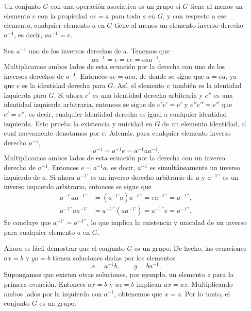 \begin{theorem}{}{}
    Un conjunto $G$ con una operación asociativa es un grupo si $G$ tiene al menos un elemento $e$ con la propiedad $ae = a$ para todo $a$ en $G$, y con respecto a ese elemento, cualquier elemento $a$ en $G$ tiene al menos un elemento inverso derecho $a^{-1}$, es decir, $aa^{-1} = e$.

    \tcblower
    \demostracion Sea $a^{-1}$ uno de los inversos derechos de $a$. Tenemos que
    $$aa^{-1} = e = ee = eaa^{-1}.$$
    Multiplicamos ambos lados de esta ecuación por la derecha con uno de los inversos derechos de $a^{-1}$. Entonces $ae = aea$, de donde se sigue que $a = ea$, ya que $e$ es la identidad derecha para $G$. Así, el elemento $e$ también es la identidad izquierda para $G$. Si ahora $e'$ es una identidad derecha arbitraria y $e''$ es una identidad izquierda arbitraria, entonces se sigue de $e'e' = e'$ y $e''e'' = e''$ que $e' = e''$, es decir, cualquier identidad derecha es igual a cualquier identidad izquierda. Esto prueba la existencia y unicidad en $G$ de un elemento identidad, al cual nuevamente denotamos por $e$. Además, para cualquier elemento inverso derecho $a^{-1}$,
    $$a^{-1} = a^{-1}e = a^{-1}aa^{-1}.$$
    Multiplicamos ambos lados de esta ecuación por la derecha con un inverso derecho de $a^{-1}$. Entonces $e = a^{-1}a$, es decir, $a^{-1}$ es simultáneamente un inverso izquierdo de $a$. Si ahora $a^{-1\prime}$ es un inverso derecho arbitrario de $a$ y $a^{-1\prime\prime}$ es un inverso izquierdo arbitrario, entonces se sigue que
    \begin{align*}
        a^{-1\prime}aa^{-1\prime\prime} & = \left(a^{-1\prime}a\right) a^{-1\prime\prime} = ea^{-1\prime\prime} = a^{-1\prime\prime}, \\
        a^{-1\prime\prime}aa^{-1\prime} & = a^{-1\prime\prime} \left(aa^{-1\prime}\right) = a^{-1\prime\prime}e = a^{-1\prime\prime}.
    \end{align*}
    Se concluye que $a^{-1\prime} = a^{-1\prime\prime}$, lo que implica la existencia y unicidad de un inverso para cualquier elemento $a$ en $G$.
\end{theorem}

Ahora es fácil demostrar que el conjunto $G$ es un grupo. De hecho, las ecuaciones $ax = b$ y $ya = b$ tienen soluciones dadas por los elementos
$$x = a^{-1}b, \qquad y = ba^{-1}.$$
Supongamos que existen otras soluciones, por ejemplo, un elemento $z$ para la primera ecuación. Entonces $ax = b$ y $az = b$ implican $ax = az$. Multiplicando ambos lados por la izquierda con $a^{-1}$, obtenemos que $x = z$. Por lo tanto, el conjunto $G$ es un grupo.

